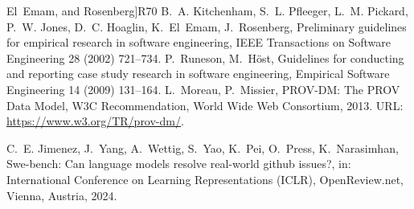 \documentclass[10pt,a4paper]{article}
\providecommand{\bibinfo}[2]{#2}
\providecommand{\URLprefix}{URL: }
\begin{document}
\begin{thebibliography}{25}
{  El~Emam, and Rosenberg}]{R70}
\bibinfo{author}{B.~A. Kitchenham}, \bibinfo{author}{S.~L. Pfleeger},
  \bibinfo{author}{L.~M. Pickard}, \bibinfo{author}{P.~W. Jones},
  \bibinfo{author}{D.~C. Hoaglin}, \bibinfo{author}{K.~El~Emam},
  \bibinfo{author}{J.~Rosenberg},
\newblock \bibinfo{title}{Preliminary guidelines for empirical research in
  software engineering},
\newblock \bibinfo{journal}{IEEE Transactions on Software Engineering}
  \bibinfo{volume}{28} (\bibinfo{year}{2002}) \bibinfo{pages}{721--734}.
\bibinfo{author}{P.~Runeson}, \bibinfo{author}{M.~H{\"o}st},
\newblock \bibinfo{title}{Guidelines for conducting and reporting case study
  research in software engineering},
\newblock \bibinfo{journal}{Empirical Software Engineering}
  \bibinfo{volume}{14} (\bibinfo{year}{2009}) \bibinfo{pages}{131--164}.
\bibinfo{author}{L.~Moreau}, \bibinfo{author}{P.~Missier},
  \bibinfo{title}{PROV-DM: The PROV Data Model}, \bibinfo{type}{W3C
  Recommendation}, World Wide Web Consortium, \bibinfo{year}{2013}. \URLprefix
  \url{https://www.w3.org/TR/prov-dm/}.

\bibinfo{author}{C.~E. Jimenez}, \bibinfo{author}{J.~Yang},
  \bibinfo{author}{A.~Wettig}, \bibinfo{author}{S.~Yao},
  \bibinfo{author}{K.~Pei}, \bibinfo{author}{O.~Press},
  \bibinfo{author}{K.~Narasimhan},
\newblock \bibinfo{title}{Swe-bench: Can language models resolve real-world
  github issues?},
\newblock in: \bibinfo{booktitle}{International Conference on Learning
  Representations (ICLR)}, \bibinfo{publisher}{OpenReview.net},
  \bibinfo{address}{Vienna, Austria}, \bibinfo{year}{2024}.
\end{thebibliography}
\end{document}
